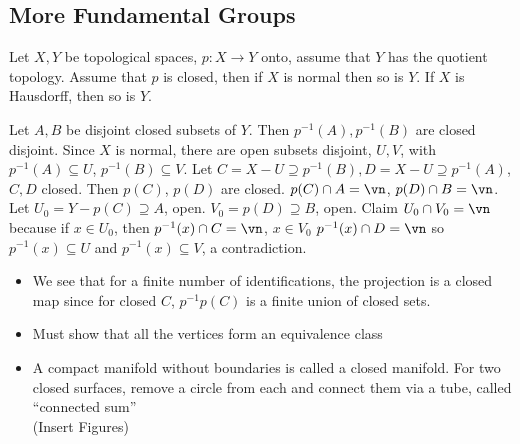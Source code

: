 
\subsection{More Fundamental Groups} 

\begin{proposition}
    Let $X,Y$ be topological spaces, $p: X \to Y$ onto, assume that $Y$ has the quotient topology. Assume that $p$ is closed, then if $X$ is normal then so is $Y$. If $X$ is Hausdorff, then so is $Y$.
\end{proposition}

\begin{pf}
    Let $A,B$ be disjoint closed subsets of $Y$. Then $p^{-1}(A), p^{-1}(B)$ are closed disjoint. Since $X$ is normal, there are open subsets disjoint, $U, V$, with $p^{-1}(A) \subseteq U$, $p^{-1}(B) \subseteq V$. Let $C = X-U \supseteq p^{-1}(B), D = X-U \supseteq p^{-1}(A)$, $C,D$ closed. Then $p(C)$, $p(D)$ are closed. $p(C) \cap A = \vn$, $p(D) \cap B = \vn$. Let $U_0 = Y - p(C) \supseteq A$, open. $V_0 = p(D) \supseteq B$, open. Claim $U_0 \cap V_0 = \vn$ because if $x \in U_0$, then $p^{-1}(x) \cap C = \vn$, $x \in V_0$ $p^{-1}(x) \cap D = \vn$ so $p^{-1}(x) \subseteq U$ and $p^{-1}(x) \subseteq V$, a contradiction. 
\end{pf}    

\begin{itemize}
    \item We see that for a finite number of identifications, the projection is a closed map since for closed $C$, $p^{-1}p(C)$ is a finite union of closed sets. 
    \item Must show that all the vertices form an equivalence class 
    \item A compact manifold without boundaries is called a closed manifold. 
    For two closed surfaces, remove a circle from each and connect them via a tube, called ``connected sum'' \\
    (Insert Figures)
\end{itemize}